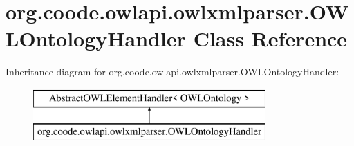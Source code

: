 \hypertarget{classorg_1_1coode_1_1owlapi_1_1owlxmlparser_1_1_o_w_l_ontology_handler}{\section{org.\-coode.\-owlapi.\-owlxmlparser.\-O\-W\-L\-Ontology\-Handler Class Reference}
\label{classorg_1_1coode_1_1owlapi_1_1owlxmlparser_1_1_o_w_l_ontology_handler}
}
Inheritance diagram for org.\-coode.\-owlapi.\-owlxmlparser.\-O\-W\-L\-Ontology\-Handler\-:\begin{figure}[H]
\begin{center}
\leavevmode
\includegraphics[height=2.000000cm]{classorg_1_1coode_1_1owlapi_1_1owlxmlparser_1_1_o_w_l_ontology_handler}
\end{center}
\end{figure}
